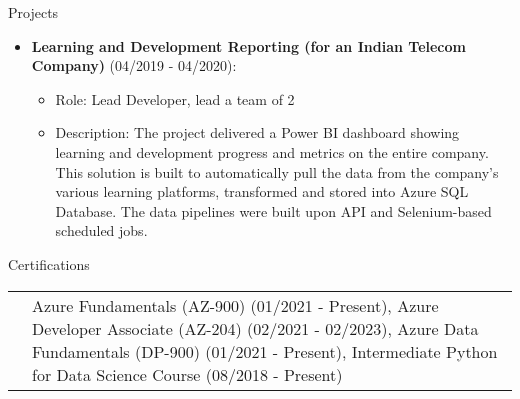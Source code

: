 \documentclass{resume} %
\makeatletter
\newcommand{\entry}[2]{#1 & #2 \tabularnewline} %
\newcommand{\tableEnv}[2]{%
    \begin{rSection}{#1} %
        \begin{adjustwidth}{0.0in}{0.1in} %
            \begin{tabularx}{\linewidth}{@{} >{\bfseries}l @{\hspace{6ex}} X @{}}
                #2 %
            \end{tabularx}
        \end{adjustwidth}
    \end{rSection}
}
\makeatother
\begin{document}
\begin{rSection}{Projects}
        \begin{itemize}
            \item \textbf{Learning and Development Reporting (for an Indian Telecom Company)} (04/2019 - 04/2020):
            \begin{itemize}
                \item Role: Lead Developer, lead a team of 2
                \item Description: The project delivered a Power BI dashboard showing learning and development progress and metrics on the entire company. This solution is built to automatically pull the data from the company's various learning platforms, transformed and stored into Azure SQL Database. The data pipelines were built upon API and Selenium-based scheduled jobs.
            \end{itemize}
        \end{itemize}
        
    \end{rSection}
    
    
    
    \tableEnv{Certifications}{
        \entry{}{Azure Fundamentals (AZ-900) (01/2021 - Present), Azure Developer Associate (AZ-204) (02/2021 - 02/2023), Azure Data Fundamentals (DP-900) (01/2021 - Present), Intermediate Python for Data Science Course (08/2018 - Present)}
    }
    
    
    
\end{document}
